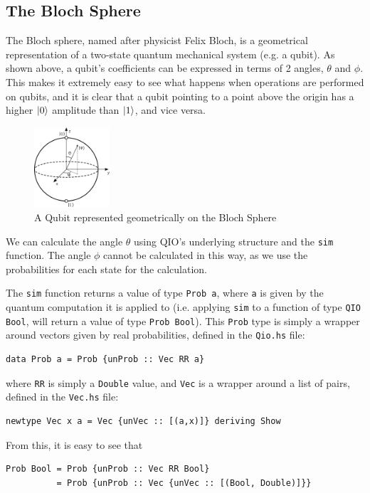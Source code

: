 \documentclass[a4paper,10pt, titlepage, twoside]{article}
\begin{document}
\subsection{The Bloch Sphere}
The Bloch sphere, named after physicist Felix Bloch, is a geometrical representation of a two-state quantum mechanical system (e.g. a qubit). As shown above, a qubit's coefficients can be expressed in terms of 2 angles, $\theta$ and $\phi$. This makes it extremely easy to see what happens when operations are performed on qubits, and it is clear that a qubit pointing to a point above the origin has a higher $\ket{0}$ amplitude than $\ket{1}$, and vice versa.\par
\begin{figure}[H]
	\centering
	\includegraphics[width=0.25\textwidth]{blochsphere}
	\caption{A Qubit represented geometrically on the Bloch Sphere}
\end{figure}
We can calculate the angle $\theta$ using QIO's underlying structure and the \texttt{sim} function. The angle $\phi$ cannot be calculated in this way, as we use the probabilities for each state for the calculation.\par
The \texttt{sim} function returns a value of type \texttt{Prob a}, where \texttt{a} is given by the quantum computation it is applied to (i.e. applying \texttt{sim} to a function of type \texttt{QIO Bool}, will return a value of type \texttt{Prob Bool}). This \texttt{Prob} type is simply a wrapper around vectors given by real probabilities, defined in the \texttt{Qio.hs} file:
\begin{verbatim}
data Prob a = Prob {unProb :: Vec RR a}
\end{verbatim}
where \texttt{RR} is simply a \texttt{Double} value, and \texttt{Vec} is a wrapper around a list of pairs, defined in the \texttt{Vec.hs} file:
\begin{verbatim}
newtype Vec x a = Vec {unVec :: [(a,x)]} deriving Show
\end{verbatim}
From this, it is easy to see that
\begin{verbatim}
Prob Bool = Prob {unProb :: Vec RR Bool} 
          = Prob {unProb :: Vec {unVec :: [(Bool, Double)]}}
\end{verbatim}
\end{document}

